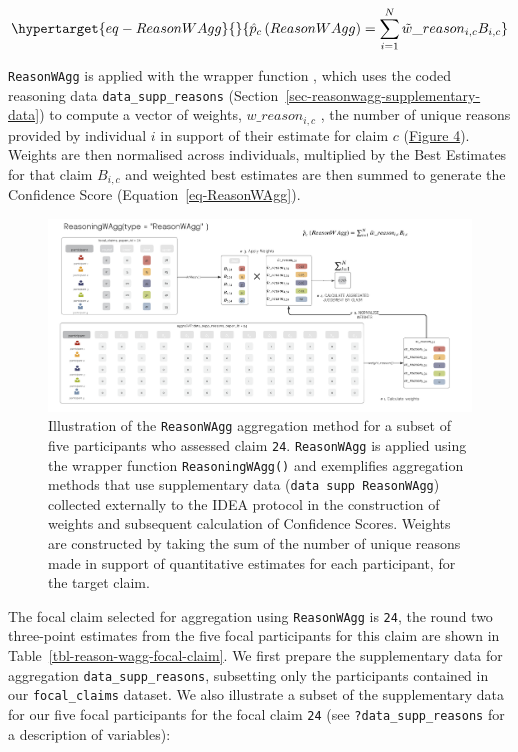 \documentclass[article]{jss}
\newcommand{\fct}[1]{\code{#1()}}
\begin{document}
\begin{equation}\protect\hypertarget{eq-ReasonWAgg}{}{
\hat{p}_c\left( ReasonWAgg \right) = \sum_{i=1}^N \tilde{w}\_reason_{i,c}B_{i,c}
}\label{eq-ReasonWAgg}\end{equation}

\texttt{ReasonWAgg} is applied with the wrapper function
\fct{ReasoningWAgg}, which uses the coded reasoning data
\texttt{data\_supp\_reasons}
(Section~\ref{sec-reasonwagg-supplementary-data}) to compute a vector of
weights, \(w\_reason_{i,c}\) , the number of unique reasons provided by
individual \(i\) in support of their estimate for claim \(c\)
(\protect\hyperlink{fig-ReasonWAgg}{Figure 4}). Weights are then
normalised across individuals, multiplied by the Best Estimates for that
claim \(B_{i,c}\) and weighted best estimates are then summed to
generate the Confidence Score (Equation~\ref{eq-ReasonWAgg}).

\begin{figure}

{\centering \includegraphics[width=5.82in,height=\textheight]{images/ReasonWAgg.png}

}

\caption{\label{fig-ReasonWAgg}Illustration of the \texttt{ReasonWAgg}
aggregation method for a subset of five participants who assessed claim
\texttt{24}. \texttt{ReasonWAgg} is applied using the wrapper function
\texttt{ReasoningWAgg()} and exemplifies aggregation methods that use
supplementary data (\texttt{data~supp~ReasonWAgg}) collected externally
to the IDEA protocol in the construction of weights and subsequent
calculation of Confidence Scores. Weights are constructed by taking the
sum of the number of unique reasons made in support of quantitative
estimates for each participant, for the target claim.}

\end{figure}

The focal claim selected for aggregation using \texttt{ReasonWAgg} is
\texttt{24}, the round two three-point estimates from the five focal
participants for this claim are shown in
Table~\ref{tbl-reason-wagg-focal-claim}. We first prepare the
supplementary data for aggregation \texttt{data\_supp\_reasons},
subsetting only the participants contained in our \texttt{focal\_claims}
dataset. We also illustrate a subset of the supplementary data for our
five focal participants for the focal claim \texttt{24} (see
\texttt{?data\_supp\_reasons} for a description of variables):
\end{document}
